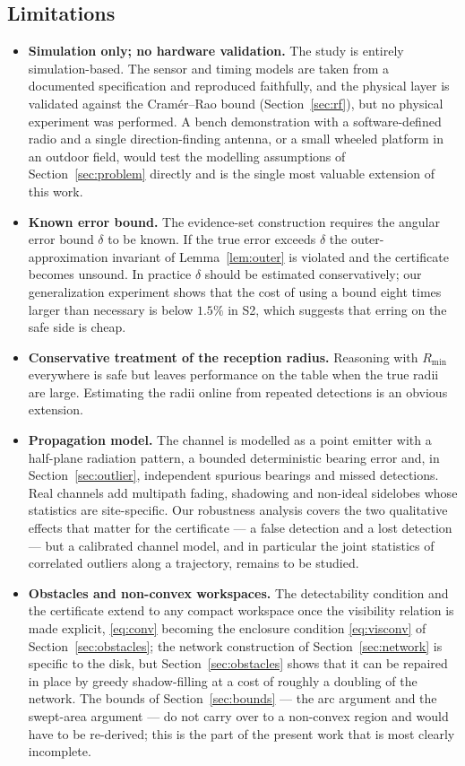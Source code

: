 \documentclass[preprint,12pt,3p]{elsarticle}
\theoremstyle{definition}
\newcommand{\Rmin}{R_{\min}}
\begin{document}
\subsection{Limitations}
\begin{itemize}
\item \textbf{Simulation only; no hardware validation.} The study is entirely simulation-based.
The sensor and timing models are taken from a documented specification and reproduced faithfully,
and the physical layer is validated against the Cram\'er--Rao bound (Section~\ref{sec:rf}), but no
physical experiment was performed. A bench demonstration with a software-defined radio and a
single direction-finding antenna, or a small wheeled platform in an outdoor field, would test the
modelling assumptions of Section~\ref{sec:problem} directly and is the single most valuable
extension of this work.
\item \textbf{Known error bound.} The evidence-set construction requires the angular error bound
$\delta$ to be known. If the true error exceeds $\delta$ the outer-approximation invariant of
Lemma~\ref{lem:outer} is violated and the certificate becomes unsound. In practice $\delta$ should
be estimated conservatively; our generalization experiment shows that the cost of using a bound
eight times larger than necessary is below $1.5\%$ in S2, which suggests that erring on the safe
side is cheap.
\item \textbf{Conservative treatment of the reception radius.} Reasoning with $\Rmin$ everywhere
is safe but leaves performance on the table when the true radii are large. Estimating the radii
online from repeated detections is an obvious extension.
\item \textbf{Propagation model.} The channel is modelled as a point emitter with a half-plane
radiation pattern, a bounded deterministic bearing error and, in
Section~\ref{sec:outlier}, independent spurious bearings and missed detections. Real channels add
multipath fading, shadowing and non-ideal sidelobes whose statistics are site-specific. Our
robustness analysis covers the two qualitative effects that matter for the certificate --- a false
detection and a lost detection --- but a calibrated channel model, and in particular the joint
statistics of correlated outliers along a trajectory, remains to be studied.
\item \textbf{Obstacles and non-convex workspaces.} The detectability condition and the
certificate extend to any compact workspace once the visibility relation is made explicit,
\eqref{eq:conv} becoming the enclosure condition \eqref{eq:visconv} of
Section~\ref{sec:obstacles}; the network construction of Section~\ref{sec:network} is specific to
the disk, but Section~\ref{sec:obstacles} shows that it can be repaired in place by greedy
shadow-filling at a cost of roughly a doubling of the network. The bounds of
Section~\ref{sec:bounds} --- the arc argument and the swept-area argument --- do not carry over to
a non-convex region and would have to be re-derived; this is the part of the present work that is
most clearly incomplete.
\end{itemize}
\end{document}
